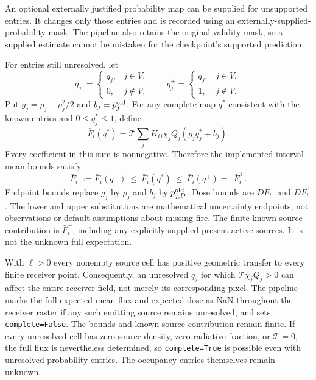 \documentclass[11pt,a4paper]{article}
\begin{document}
An optional externally justified probability map can be supplied for
unsupported entries. It changes only those entries and is recorded using
an externally-supplied-probability mask. The pipeline also retains the
original validity mask, so a supplied estimate cannot be mistaken for the
checkpoint's supported prediction.

For entries still unresolved, let
\begin{equation}
 q_j^-=
 \begin{cases}q_j,&j\in V,\\0,&j\notin V,\end{cases}
 \qquad
 q_j^+=
 \begin{cases}q_j,&j\in V,\\1,&j\notin V.\end{cases}
\end{equation}
Put $g_j=\rho_j-\rho_j^2/2$ and $b_j=\bar p_j^{\rm old}$.
For any complete map $q^*$ consistent with the known entries and
$0\le q_j^*\le1$, define
\begin{equation}
 \bar F_i(q^*)=\mathcal T\sum_jK_{ij}\chi_jQ_j(g_jq_j^*+b_j).
\end{equation}
Every coefficient in this sum is nonnegative. Therefore the implemented
interval-mean bounds satisfy
\begin{equation}
 \boxed{\bar F_i^-:=\bar F_i(q^-)
 \ \le\ \bar F_i(q^*)\ \le\ \bar F_i(q^+)=:\bar F_i^+.}
 \label{eq:heat-bounds}
\end{equation}
Endpoint bounds replace $g_j$ by $\rho_j$ and $b_j$ by
$p_{j,D}^{\rm old}$. Dose bounds are $D\bar F_i^-$ and $D\bar F_i^+$.
The lower and upper substitutions are mathematical uncertainty endpoints,
not observations or default assumptions about missing fire.
The finite known-source contribution is $\bar F_i^-$, including any
explicitly supplied present-active sources. It is not the unknown full
expectation.

With $\ell>0$ every nonempty source cell has positive geometric transfer to
every finite receiver point. Consequently, an unresolved $q_j$ for which
$\mathcal T\chi_jQ_j>0$ can affect the entire receiver field, not merely its
corresponding pixel. The pipeline marks the full expected mean flux and
expected dose as NaN throughout the receiver raster if any such emitting
source remains unresolved, and sets \texttt{complete=False}. The bounds
and known-source contribution remain finite. If every unresolved cell has
zero source density, zero radiative fraction, or $\mathcal T=0$, the full flux is
nevertheless determined, so \texttt{complete=True} is possible even with
unresolved probability entries. The occupancy entries themselves remain
unknown.
\end{document}
